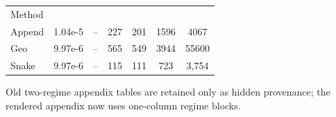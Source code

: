 \documentclass[
  reprint,
  amsmath,
  amssymb,
  aps,
  pra,
  nofootinbib,
  superscriptaddress,
  floatfix
]{revtex4-2}
\newcommand{\metrichead}[1]{\makebox[0.061\textwidth][c]{#1}}
\begin{document}
\noindent\begin{minipage}{\columnwidth}
\begin{center}
\scriptsize
\setlength{\tabcolsep}{1.1pt}
\renewcommand{\arraystretch}{1.02}
\begin{ruledtabular}
\begin{tabular}{p{}cccccc}
Method & \metrichead{$|\Delta E|$} & \metrichead{$1-F$} & \metrichead{$N_{2q}$} & \metrichead{$D_{2q}$} & \metrichead{$D_c$} & \metrichead{$S$}\\
\colrule
Append & 1.04e-5 & -- & 227 & 201 & 1596 & 4067\\
Geo & 9.97e-6 & -- & 565 & 549 & 3944 & 55600\\
Snake & 9.97e-6 & -- & 115 & 111 & 723 & 3,754\\
\end{tabular}
\end{ruledtabular}
\end{center}
\end{minipage}
\par\addvspace{1.0ex}

\iffalse
Old two-regime appendix tables are retained only as hidden provenance; the rendered
appendix now uses one-column regime blocks.
\clearpage
\end{document}
